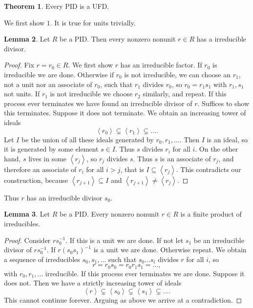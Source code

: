 \documentclass{article}
\newcommand{\rb}[1]{\left( #1 \right)}
\newcommand{\ab}[1]{\left\langle #1 \right\rangle}
\theoremstyle{definition}\newtheorem{definition}{Definition}[subsection]
\theoremstyle{definition}\newtheorem{remark}[definition]{Remark}
\theoremstyle{definition}\newtheorem*{example}{Example}
\theoremstyle{definition}\newtheorem*{note}{Note}
\newtheorem{lemma}[definition]{Lemma}
\newtheorem{theorem}[definition]{Theorem}
\begin{document}
\begin{theorem}
\label{thm:3.3.2}
Every PID is a UFD.
\end{theorem}

We first show $ 1 $. It is true for units trivially.

\begin{lemma}
Let $ R $ be a PID. Then every nonzero nonunit $ r \in R $ has a irreducible divisor.
\end{lemma}

\begin{proof}
Fix $ r = r_0 \in R $. We first show $ r $ has an irreducible factor. If $ r_0 $ is irreducible we are done. Otherwise if $ r_0 $ is not irreducible, we can choose an $ r_1 $, not a unit nor an associate of $ r_0 $, such that $ r_1 $ divides $ r_0 $, so $ r_0 = r_1s_1 $ with $ r_1, s_1 $ not units. If $ r_1 $ is not irreducible we choose $ r_2 $ similarly, and repeat. If this process ever terminates we have found an irreducible divisor of $ r $. Suffices to show this terminates. Suppose it does not terminate. We obtain an increasing tower of ideals
$$ \ab{r_0} \subsetneq \ab{r_1} \subsetneq \dots. $$
Let $ I $ be the union of all these ideals generated by $ r_0, r_1, \dots $. Then $ I $ is an ideal, so it is generated by some element $ s \in I $. Thus $ s $ divides $ r_i $ for all $ i $. On the other hand, $ s $ lives in some $ \ab{r_j} $, so $ r_j $ divides $ s $. Thus $ s $ is an associate of $ r_j $, and therefore an associate of $ r_i $ for all $ i > j $, that is $ I \subseteq \ab{r_j} $. This contradicts our construction, because $ \ab{r_{j + 1}} \subseteq I $ and $ \ab{r_{j + 1}} \ne \ab{r_j} $.
\end{proof}

Thus $ r $ has an irreducible divisor $ s_0 $.

\begin{lemma}
Let $ R $ be a PID. Every nonzero nonunit $ r \in R $ is a finite product of irreducibles.
\end{lemma}

\begin{proof}
Consider $ rs_0^{-1} $. If this is a unit we are done. If not let $ s_1 $ be an irreducible divisor of $ rs_0^{-1} $. If $ r\rb{s_0s_1}^{-1} $ is a unit we are done. Otherwise repeat. We obtain a sequence of irreducibles $ s_0, s_1, \dots $ such that $ s_0 \dots s_i $ divides $ r $ for all $ i $, so
$$ r = r_0s_0 = r_0r_1s_1 = \dots, $$
with $ r_0, r_1, \dots $ irreducible. If this process ever terminates we are done. Suppose it does not. Then we have a strictly increasing tower of ideals
$$ \ab{r} \subsetneq \ab{s_0} \subsetneq \ab{s_1} \subsetneq \dots. $$
This cannot continue forever. Arguing as above we arrive at a contradiction.
\end{proof}
\end{document}
